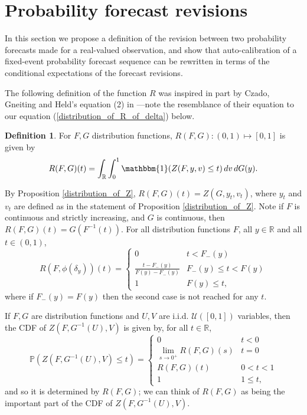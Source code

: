 \documentclass[aap]{imsart}
\theoremstyle{plain}
\theoremstyle{definition}
\newtheorem{definition}[theorem]{Definition}
\begin{document}
\section{Probability forecast revisions}\label{revisions}
In this section we propose a definition of the revision between two probability forecasts made for a real-valued observation, and show that auto-calibration of a fixed-event probability forecast sequence can be rewritten in terms of the conditional expectations of the forecast revisions.

The following definition of the function $R$ was inspired in part by Czado, Gneiting and Held's equation (2) in \cite{Czd09}---note the resemblance of their equation to our equation (\ref{distribution_of_R_of_delta}) below.
\begin{definition}
  For $F, G$ distribution functions, $R(F, G) : (0,1) \mapsto [0,1]$ is given by
\begin{equation*}
  R(F, G)(t) = \int_\mathbb{R} \int_0^1 \mathbbm{1}(Z(F, y, v) \leq t) \,dv \,dG(y).
\end{equation*}
\end{definition}
By Proposition \ref{distribution_of_Z}, $R(F, G)(t) = Z(G, y_t, v_t)$, where $y_t$ and $v_t$ are defined as in the statement of Proposition \ref{distribution_of_Z}. Note if $F$ is continuous and strictly increasing, and $G$ is continuous, then $R(F, G)(t) = G(F^{-1}(t))$. For all distribution functions $F$, all $y \in \mathbb{R}$ and all $t \in (0,1)$,
\begin{equation}\label{distribution_of_R_of_delta}
  R(F, \phi(\delta_y))(t) = \begin{cases}
    0 & t < F_-(y) \\
    \frac{t-F_-(y)}{F(y)-F_-(y)} & F_-(y) \leq t < F(y) \\
    1 & F(y) \leq t,
  \end{cases}
\end{equation}
where if $F_-(y) = F(y)$ then the second case is not reached for any $t$.

If $F, G$ are distribution functions and $U, V$ are i.i.d. $\mathcal{U}([0,1])$ variables, then the CDF of $Z(F, G^{-1}(U), V)$ is given by, for all $t \in \mathbb{R}$,
\begin{equation*}
  \mathbb{P}(Z(F, G^{-1}(U), V) \leq t) = \begin{cases}
    0                           & t < 0 \\
    \lim_{s \to 0^+} R(F, G)(s) & t = 0 \\
    R(F, G)(t)                  & 0 < t < 1 \\
    1                           & 1 \leq t,
  \end{cases}
\end{equation*}
and so it is determined by $R(F, G)$; we can think of $R(F, G)$ as being the important part of the CDF of $Z(F, G^{-1}(U), V)$.
\end{document}
